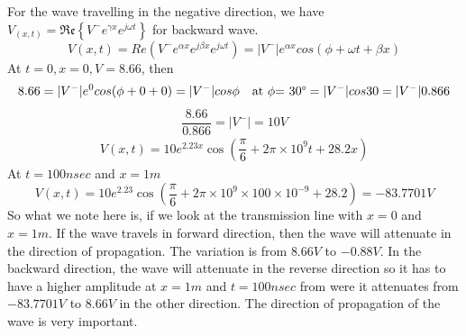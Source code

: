 \begin{exmp}
For the wave travelling in the negative direction, we have $V_{(x,t)} = \mathfrak{Re}\left\lbrace V^{-}e^{\gamma x}e^{j\omega t}\right\rbrace$ for backward wave.
\begin{dmath*}
V(x,t) = Re({V^{-}e^{\alpha x}e^{j\beta x}e^{j\omega t}}) = {|V^{-}|e^{\alpha x}cos{(\phi+\omega t + \beta x)}}
\end{dmath*}
At ${t=0, x=0, V=8.66}$, then
\begin{dmath*}
{8.66} = {|V^{-}|}e^{0} cos({\phi + 0 + 0})
= {|V^-|{cos\phi}} \quad \text{at }\phi\text{= 30\textdegree} 
= {|V^-|{cos30}}
= {|V^-|{0.866}}
\end{dmath*}
\begin{dmath*}
\frac{8.66}{0.866} = {|V^-|} = 10V
\end{dmath*}
\begin{align*}
V({x,t}) = 10e^{2.23x} \cos({\dfrac{\pi}{6} + 2\pi\times10^9t + 28.2x})
\end{align*}
At ${t=100nsec}$ and ${x=1m}$
\begin{dmath*}
V({x,t}) = 10e^{2.23} \cos({\dfrac{\pi}{6} + 2\pi\times10^9\times100\times10^{-9} + 28.2})
= -83.7701V
\end{dmath*}
So what we note here is, if we look at the transmission line with ${x=0}$ and ${x=1m}$. If the wave travels in forward direction, then the wave will attenuate in the direction of propagation. The variation is from ${8.66V}$ to ${-0.88V}$. In the backward direction, the wave will attenuate in the reverse direction so it has to  have a higher amplitude at ${x=1m}$ and ${t=100nsec}$ from were it attenuates from ${-83.7701V}$ to ${8.66V}$ in the other direction. The direction of propagation of the wave is very important.
\end{exmp}

